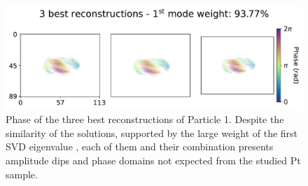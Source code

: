 \begin{figure}[H]
    \centering
    \includegraphics[width=\textwidth]{figures/Phasing/modes_particle1-1.pdf}
    \caption{Phase of the three best reconstructions of Particle 1. Despite the similarity of the solutions, supported 
    by the large weight of the first SVD eigenvalue \cite{favre-nicolin_free_2020}, each of them and their combination 
    presents amplitude dips and phase domains not expected from the studied Pt sample. }
    \label{fig:pynx_rec1_modes}
\end{figure}


